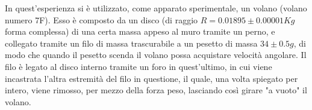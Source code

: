 In quest'esperienza si è utilizzato, come apparato sperimentale, un volano
(volano numero 7F). Esso è composto da un disco (di raggio $R = 0.01895 \pm
0.00001 Kg$ forma complessa) di una certa massa appeso al muro tramite un perno, e
collegato tramite un filo di massa trascurabile a un pesetto di massa $34 \pm 0.5 g$, di modo che quando il
pesetto scenda il volano possa acquistare velocità angolare.
Il filo è legato al disco interno tramite un foro in quest'ultimo, in cui
viene incastrata l'altra estremità del filo in questione, il quale, una volta
spiegato per intero, viene rimosso, per mezzo della forza peso, lasciando così girare "a vuoto" il volano.

